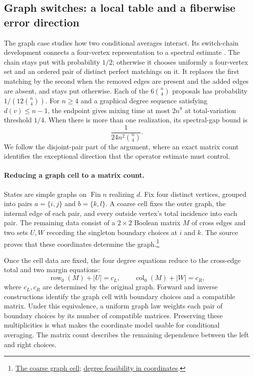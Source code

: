 \subsection{Graph switches: a local table and a fiberwise error direction}
\label{sec:switch-chain}

The graph case studies how two conditional averages interact. Its
switch-chain development connects a four-vertex representation to a
spectral estimate \citep{OAISwitch}. The chain stays put with probability
$1/2$; otherwise it chooses uniformly a four-vertex set and an ordered
pair of distinct perfect matchings on it. It replaces the first matching
by the second when the removed edges are present and the added edges are
absent, and stays put otherwise. Each of the $6\binom n4$ proposals has
probability $1/(12\binom n4)$. For $n\geq4$ and a graphical degree
sequence satisfying $d(v)\leq n-1$, the endpoint gives mixing time at most
$2n^8$ at total-variation threshold $1/4$. When there is more than one
realization, its spectral-gap bound is
\[
 \frac{1}{24n^2\binom n4}.
\]
We follow the disjoint-pair part of the argument, where an exact matrix
count identifies the exceptional direction that the operator estimate
must control.

\paragraph{Reducing a graph cell to a matrix count.}
States are simple graphs on $\operatorname{Fin}n$ realizing $d$. Fix four distinct vertices, grouped into pairs $a=\{i,j\}$ and $b=\{k,l\}$. A coarse cell fixes the outer graph, the internal edge of each pair, and every outside vertex's total incidence into each pair. The remaining data consist of a $2\times2$ Boolean matrix $M$ of cross edges and two sets $U,W$ recording the singleton boundary choices at $i$ and $k$. The source proves that these coordinates determine the graph.\footnote{\href{https://github.com/openai/math/blob/fd4aeeb2ee4fc729c18d98444fed42fd0529eeeb/lean/OAI/Probability/SwitchChain/DisjointEncoding.lean\#L20-L30}{The coarse graph cell}; \href{https://github.com/openai/math/blob/fd4aeeb2ee4fc729c18d98444fed42fd0529eeeb/lean/OAI/Probability/SwitchChain/DisjointCoordinateFeasibility.lean\#L22-L108}{degree feasibility in coordinates}.}

Once the cell data are fixed, the four degree equations reduce to the
cross-edge total and two margin equations:
\[
 \operatorname{row}_0(M)+|U|=c_L,\qquad
 \operatorname{col}_0(M)+|W|=c_R,
\]
where $c_L,c_R$ are determined by the original graph. Forward and inverse
constructions identify the graph cell with boundary choices and a
compatible matrix. Under this equivalence, a uniform graph law weights
each pair of boundary choices by its number of compatible matrices.
Preserving these multiplicities is what makes the coordinate model usable
for conditional averaging. The matrix count describes the remaining
dependence between the left and right choices.

